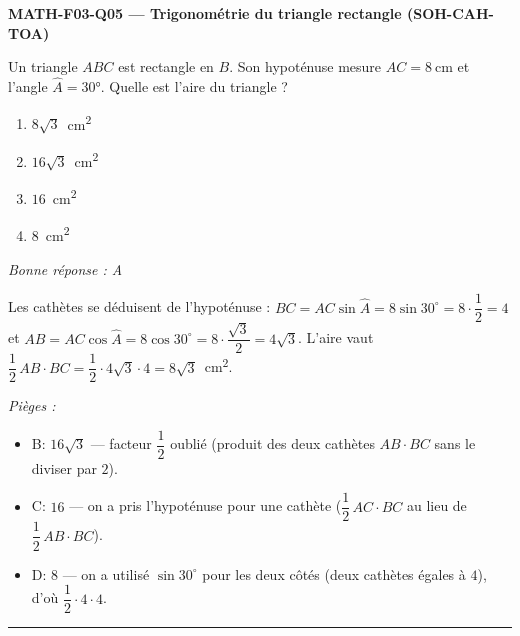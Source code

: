 \documentclass[11pt,a4paper]{article}
\begin{document}
\noindent\textbf{MATH-F03-Q05 --- Trigonométrie du triangle rectangle (SOH-CAH-TOA)}\par
Un triangle $ABC$ est rectangle en $B$. Son hypoténuse mesure $AC=\qty{8}{\centi\metre}$ et l'angle $\widehat{A}=\ang{30}$. Quelle est l'aire du triangle ?
\begin{enumerate}[label=\Alph*)]
\item $8\sqrt{3}$~\si{\centi\metre\squared}
\item $16\sqrt{3}$~\si{\centi\metre\squared}
\item $16$~\si{\centi\metre\squared}
\item $8$~\si{\centi\metre\squared}
\end{enumerate}
\textit{Bonne réponse : A}\par
Les cathètes se déduisent de l'hypoténuse : $BC=AC\sin\widehat{A}=8\sin 30^\circ=8\cdot\dfrac12=4$ et $AB=AC\cos\widehat{A}=8\cos 30^\circ=8\cdot\dfrac{\sqrt3}{2}=4\sqrt3$. L'aire vaut $\dfrac12\,AB\cdot BC=\dfrac12\cdot4\sqrt3\cdot4=8\sqrt3$~\si{\centi\metre\squared}.\par
\textit{Pièges :}
\begin{itemize}
\item B: $16\sqrt3$ --- facteur $\dfrac12$ oublié (produit des deux cathètes $AB\cdot BC$ sans le diviser par $2$).
\item C: $16$ --- on a pris l'hypoténuse pour une cathète ($\dfrac12\,AC\cdot BC$ au lieu de $\dfrac12\,AB\cdot BC$).
\item D: $8$ --- on a utilisé $\sin 30^\circ$ pour les deux côtés (deux cathètes égales à $4$), d'où $\dfrac12\cdot4\cdot4$.
\end{itemize}
\vspace{8pt}\hrule\vspace{8pt}
\end{document}
